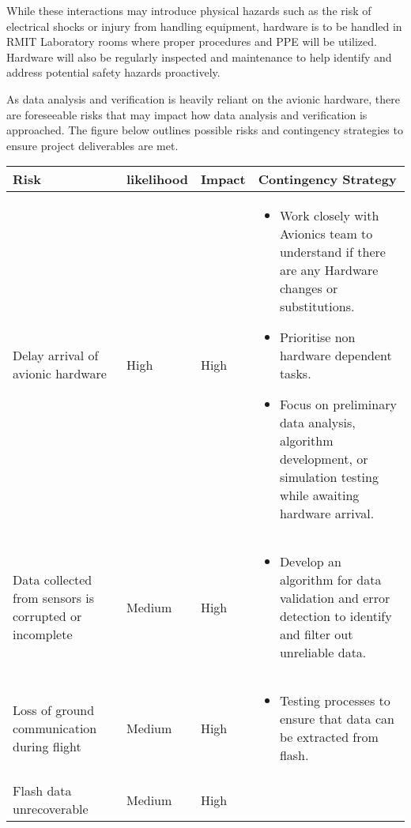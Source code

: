 While these interactions may introduce physical hazards such as the risk of electrical shocks or injury from handling equipment, hardware is to be handled in RMIT Laboratory rooms where proper procedures and PPE will be utilized. Hardware will also be regularly inspected and maintenance to help identify and address potential safety hazards proactively.  

As data analysis and verification is heavily reliant on the avionic hardware, there are foreseeable risks that may impact how data analysis and verification is approached. The figure below outlines possible risks and contingency strategies to ensure project deliverables are met.  

\begin{table}[]
\centering
\begin{tabular}{>{\raggedright}p{4cm}p{1.5cm}p{1.5cm}p{7cm}}
\toprule
\textbf{Risk} & \textbf{likelihood} & \textbf{Impact} & \textbf{Contingency Strategy} \\ \midrule
Delay arrival of avionic hardware & High & High & \vspace{-1.5em}
\begin{itemize}[leftmargin=*]
  \item Work closely with Avionics team to understand if there are any Hardware changes or substitutions.
  \item Prioritise non hardware dependent tasks.
  \item Focus on preliminary data analysis, algorithm development, or simulation testing while awaiting hardware arrival.
\end{itemize}\\\midrule
Data collected from sensors is corrupted or incomplete & Medium & High & \vspace{-1.5em}
\begin{itemize}[leftmargin=*]
  \item Develop an algorithm for data validation and error detection to identify and filter out unreliable data.
\end{itemize}\\\midrule
Loss of ground communication during flight & Medium & High & \vspace{-1.5em}
\begin{itemize}[leftmargin=*]
  \item Testing processes to ensure that data can be extracted from flash.
\end{itemize}\\\midrule
Flash data unrecoverable & Medium & High & \vspace{-1.5em}

\end{tabular}
\end{table}

